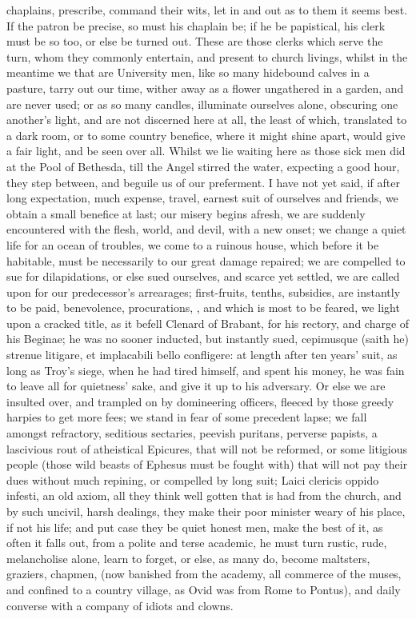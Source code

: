 {chaplains, prescribe, command their wits, let in and out as to them it
seems best. If the patron be precise, so must his chaplain be; if he be
papistical, his clerk must be so too, or else be turned out. These are
those clerks which serve the turn, whom they commonly entertain, and
present to church livings, whilst in the meantime we that are
University men, like so many hidebound calves in a pasture, tarry out
our time, wither away as a flower ungathered in a garden, and are never
used; or as so many candles, illuminate ourselves alone, obscuring one
another's light, and are not discerned here at all, the least of which,
translated to a dark room, or to some country benefice, where it might
shine apart, would give a fair light, and be seen over all. Whilst we
lie waiting here as those sick men did at the Pool of  Bethesda,
till the Angel stirred the water, expecting a good hour, they step
between, and beguile us of our preferment. I have not yet said, if
after long expectation, much expense, travel, earnest suit of ourselves
and friends, we obtain a small benefice at last; our misery begins
afresh, we are suddenly encountered with the flesh, world, and devil,
with a new onset; we change a quiet life for an ocean of troubles, we
come to a ruinous house, which before it be habitable, must be
necessarily to our great damage repaired; we are compelled to sue for
dilapidations, or else sued ourselves, and scarce yet settled, we are
called upon for our predecessor's arrearages; first-fruits, tenths,
subsidies, are instantly to be paid, benevolence, procurations, \etc{},
and which is most to be feared, we light upon a cracked title, as it
befell Clenard of Brabant, for his rectory, and charge of his Beginae;
he was no sooner inducted, but instantly sued, cepimusque (saith
he) strenue litigare, et implacabili bello confligere: at length after
ten years' suit, as long as Troy's siege, when he had tired himself,
and spent his money, he was fain to leave all for quietness' sake, and
give it up to his adversary. Or else we are insulted over, and trampled
on by domineering officers, fleeced by those greedy harpies to get more
fees; we stand in fear of some precedent lapse; we fall amongst
refractory, seditious sectaries, peevish puritans, perverse papists, a
lascivious rout of atheistical Epicures, that will not be reformed, or
some litigious people (those wild beasts of Ephesus must be fought
with) that will not pay their dues without much repining, or compelled
by long suit; Laici clericis oppido infesti, an old axiom, all they
think well gotten that is had from the church, and by such uncivil,
harsh dealings, they make their poor minister weary of his place, if
not his life; and put case they be quiet honest men, make the best of
it, as often it falls out, from a polite and terse academic, he must
turn rustic, rude, melancholise alone, learn to forget, or else, as
many do, become maltsters, graziers, chapmen, \etc{} (now banished from
the academy, all commerce of the muses, and confined to a country
village, as Ovid was from Rome to Pontus), and daily converse with a
company of idiots and clowns.

}
